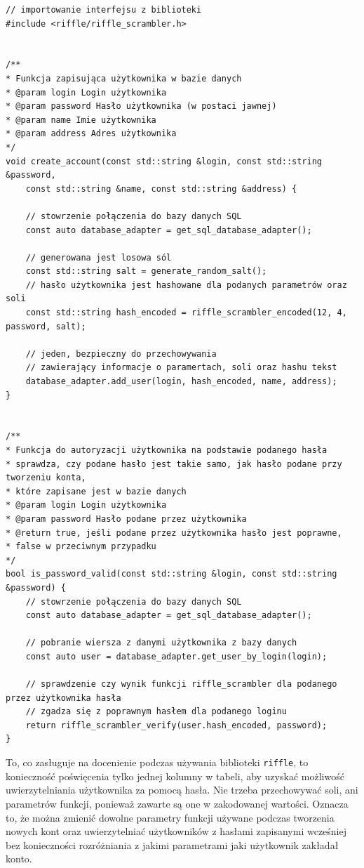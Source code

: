 \begin{verbatim}
// importowanie interfejsu z biblioteki
#include <riffle/riffle_scrambler.h>


/**
* Funkcja zapisująca użytkownika w bazie danych
* @param login Login użytkownika
* @param password Hasło użytkownika (w postaci jawnej)
* @param name Imie użytkownika
* @param address Adres użytkownika
*/
void create_account(const std::string &login, const std::string &password,
	const std::string &name, const std::string &address) {
	
	// stowrzenie połączenia do bazy danych SQL
	const auto database_adapter = get_sql_database_adapter();

	// generowana jest losowa sól
	const std::string salt = generate_random_salt();
	// hasło użytkownika jest hashowane dla podanych parametrów oraz soli
	const std::string hash_encoded = riffle_scrambler_encoded(12, 4, password, salt);

	// jeden, bezpieczny do przechowywania
	// zawierający informacje o paramertach, soli oraz hashu tekst
	database_adapter.add_user(login, hash_encoded, name, address);
}


/**
* Funkcja do autoryzacji użytkownika na podstawie podanego hasła
* sprawdza, czy podane hasło jest takie samo, jak hasło podane przy tworzeniu konta,
* które zapisane jest w bazie danych
* @param login Login użytkownika
* @param password Hasło podane przez użytkownika
* @return true, jeśli podane przez użytkownika hasło jest poprawne,
* false w przeciwnym przypadku
*/
bool is_password_valid(const std::string &login, const std::string &password) {
	// stowrzenie połączenia do bazy danych SQL
	const auto database_adapter = get_sql_database_adapter();

	// pobranie wiersza z danymi użytkownika z bazy danych
	const auto user = database_adapter.get_user_by_login(login);

	// sprawdzenie czy wynik funkcji riffle_scrambler dla podanego przez użytkownika hasła
	// zgadza się z poprawnym hasłem dla podanego loginu
	return riffle_scrambler_verify(user.hash_encoded, password);
}
\end{verbatim}

To, co zasługuje na docenienie podczas używania biblioteki \texttt{riffle}, to konieczność poświęcenia tylko jednej kolumny w tabeli, aby uzyskać możliwość uwierzytelniania użytkownika za pomocą hasła. Nie trzeba przechowywać soli, ani parametrów funkcji, ponieważ zawarte są one w zakodowanej wartości. Oznacza to, że można zmienić dowolne parametry funkcji używane podczas tworzenia nowych kont oraz uwierzytelniać użytkowników z hasłami zapisanymi wcześniej bez konieczności rozróżniania z jakimi parametrami jaki użytkownik zakładał konto.


